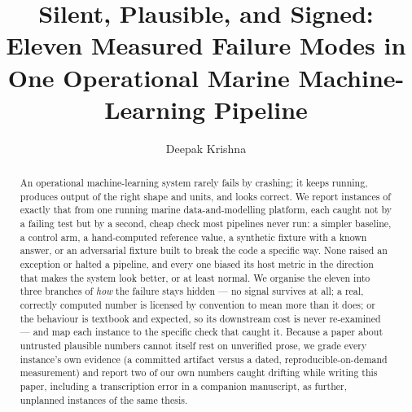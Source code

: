\documentclass[runningheads]{llncs}
\begin{document}
\title{Silent, Plausible, and Signed: Eleven Measured Failure Modes in One
Operational Marine Machine-Learning Pipeline}


\author{Deepak Krishna}

\maketitle

\begin{abstract}
An operational machine-learning system rarely fails by crashing; it keeps
running, produces output of the right shape and units, and looks correct. We
report \NInstances{} instances of exactly that from one running marine
data-and-modelling platform, each caught not by a failing test but by a
second, cheap check most pipelines never run: a simpler baseline, a control
arm, a hand-computed reference value, a synthetic fixture with a known
answer, or an adversarial fixture built to break the code a specific way.
None raised an exception or halted a pipeline, and every one biased its host
metric in the direction that makes the system look better, or at least
normal. We organise the eleven into three branches of \emph{how}
the failure stays hidden --- no signal survives at all; a real, correctly
computed number is licensed by convention to mean more than it does; or the
behaviour is textbook and expected, so its downstream cost is never
re-examined --- and map each instance to the specific check that caught it.
Because a paper about untrusted plausible numbers cannot itself rest on
unverified prose, we grade every instance's own evidence (a committed
artifact versus a dated, reproducible-on-demand measurement) and report two
of our own numbers caught drifting while writing this paper, including a
transcription error in a companion manuscript, as further,
unplanned instances of the same thesis.
\end{abstract}


\end{document}
